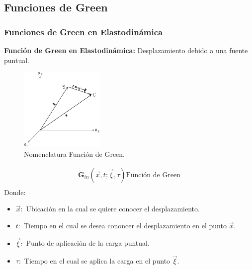 \documentclass{beamer}
\begin{document}
\subsection{Funciones de Green}
\begin{frame}[allowframebreaks]
\frametitle{Funciones de Green en Elastodinámica}
%
\justifying
%
\textbf{Función de Green en Elastodinámica:} Desplazamiento debido a una fuente puntual.
%
\begin{figure}[h]
	\centering
	\includegraphics[height=4cm]{img/Figure1.pdf}
	\caption{Nomenclatura Función de Green. \cite[figura 9.1, página 280]{book:pujol}}
	\vspace{-.5 cm}
\end{figure}
%
\begin{align*}
	\mathbf{G}_{in} \left( \vec{x}, t; \vec{\xi}, \tau \right) \text{Función de Green}\\
\end{align*}
%
Donde:
%
\begin{itemize}
%
	\item $\vec{x}:$ Ubicación en la cual se quiere conocer el desplazamiento.
	\item $t:$ Tiempo en el cual se desea cononcer el desplazamiento en el punto $\vec{x}$.
	\item $\vec{\xi}:$ Punto de aplicación de la carga puntual.
	\item $\tau:$ Tiempo en el cual se aplica la carga en el punto $\vec{\xi}$.
%
\end{itemize}
%
%
\end{frame}
%
%
\end{document}

